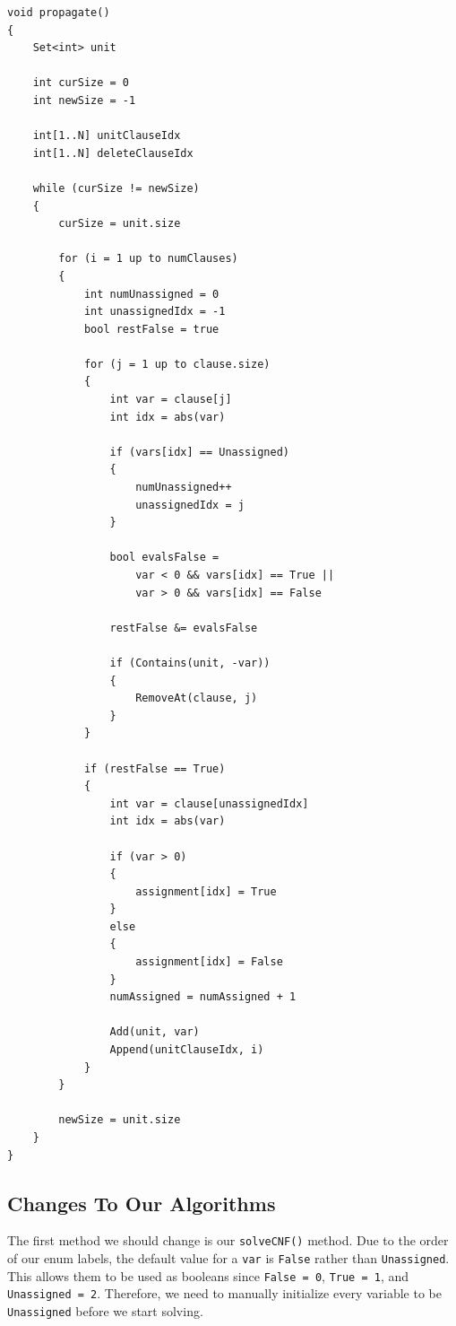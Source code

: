 \begin{lstlisting}
void propagate()
{
    Set<int> unit

    int curSize = 0
    int newSize = -1

    int[1..N] unitClauseIdx
    int[1..N] deleteClauseIdx

    while (curSize != newSize)
    {
        curSize = unit.size

        for (i = 1 up to numClauses)
        {
            int numUnassigned = 0
            int unassignedIdx = -1
            bool restFalse = true

            for (j = 1 up to clause.size)
            {
                int var = clause[j]
                int idx = abs(var)

                if (vars[idx] == Unassigned)
                {
                    numUnassigned++
                    unassignedIdx = j
                }

                bool evalsFalse =
                    var < 0 && vars[idx] == True ||
                    var > 0 && vars[idx] == False

                restFalse &= evalsFalse

                if (Contains(unit, -var))
                {
                    RemoveAt(clause, j)
                }
            }

            if (restFalse == True)
            {
                int var = clause[unassignedIdx]
                int idx = abs(var)

                if (var > 0)
                {
                    assignment[idx] = True
                }
                else
                {
                    assignment[idx] = False
                }
                numAssigned = numAssigned + 1

                Add(unit, var)
                Append(unitClauseIdx, i)
            }
        }

        newSize = unit.size
    }
}
\end{lstlisting}

\subsection{Changes To Our Algorithms}

The first method we should change is our \texttt{solveCNF()} method. Due to
the order of our enum labels, the default value for a \texttt{var} is
\texttt{False} rather than \texttt{Unassigned}. This allows them to be used as
booleans since \texttt{False = 0}, \texttt{True = 1}, and
\texttt{Unassigned = 2}. Therefore, we need to manually initialize every
variable to be \texttt{Unassigned} before we start solving.

